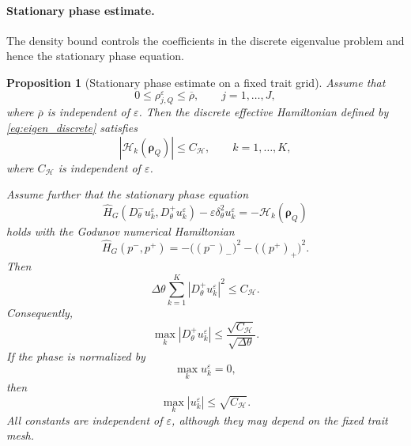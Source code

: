 \documentclass[11pt]{article}
\newtheorem{proposition}{Proposition}[section]
\begin{document}
\paragraph{Stationary phase estimate.}
The density bound controls the coefficients in the discrete eigenvalue problem
and hence the stationary phase equation.

\begin{proposition}[Stationary phase estimate on a fixed trait grid]
\label{prop:stationary_phase_estimate}
Assume that
\[
    0\le \rho_{j,Q}^\varepsilon\le \overline\rho,
    \qquad j=1,\ldots,J,
\]
where \(\overline\rho\) is independent of \(\varepsilon\). Then the discrete
effective Hamiltonian defined by \eqref{eq:eigen_discrete} satisfies
\[
    |\mathcal H_k(\boldsymbol\rho_Q)|
    \le C_{\mathcal H},
    \qquad k=1,\ldots,K,
\]
where \(C_{\mathcal H}\) is independent of \(\varepsilon\).

Assume further that the stationary phase equation
\begin{equation}\label{eq:stationary_phase}
    \widehat H_G
    \left(
        D_\theta^-u_k^\varepsilon,
        D_\theta^+u_k^\varepsilon
    \right)
    -
    \varepsilon\delta_\theta^2u_k^\varepsilon
    =
    -\mathcal H_k(\boldsymbol\rho_Q)
\end{equation}
holds with the Godunov numerical Hamiltonian
\[
    \widehat H_G(p^-,p^+)
    =
    -\bigl((p^-)_{-}\bigr)^2
    -
    \bigl((p^+)_{+}\bigr)^2 .
\]
Then
\[
    \Delta\theta
    \sum_{k=1}^K
    |D_\theta^+u_k^\varepsilon|^2
    \le
    C_{\mathcal H} .
\]
Consequently,
\[
    \max_k |D_\theta^+u_k^\varepsilon|
    \le
    \frac{\sqrt{C_{\mathcal H}}}{\sqrt{\Delta\theta}} .
\]
If the phase is normalized by
\[
    \max_k u_k^\varepsilon=0,
\]
then
\[
    \max_k |u_k^\varepsilon|
    \le
    \sqrt{C_{\mathcal H}} .
\]
All constants are independent of \(\varepsilon\), although they may depend on
the fixed trait mesh.
\end{proposition}
\end{document}
